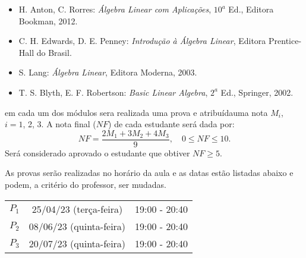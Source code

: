 \documentclass[12pt]{exam}
\begin{document}
\vspace{0.5cm}
\begin{itemize}


    \item H. Anton, C. Rorres: {\it {\'A}lgebra Linear com Aplicações}, $10^a$ Ed., Editora Bookman, 2012.

    \item C. H. Edwards, D. E. Penney: {\it Introdução à Álgebra Linear}, Editora Prentice-Hall do Brasil.

    \item S. Lang: {\it Álgebra Linear}, Editora Moderna, 2003.

    \item T. S. Blyth, E. F. Robertson: {\it Basic Linear Algebra}, $2^a$ Ed., Springer, 2002.
\end{itemize}

 em cada um dos módulos sera realizada uma prova e  atribuídauma nota $M_i$, $i=1$, 2, 3. A nota final ($NF$) de cada estudante ser\'a dada por:
\[
    NF = \dfrac{2M_1 + 3M_2 + 4M_3}{9}, \quad 0 \le NF \le 10.
\]
Ser\'a considerado aprovado o estudante que obtiver $NF \ge 5$.

\vspace{0.5cm}

As provas ser\~ao realizadas no hor\'ario da aula e as datas est\~ao listadas abaixo e podem, a crit\'erio do professor, ser mudadas.

\begin{center}
    \begin{tabular}{c|c|c}
        \hline\hline
        \hspace{1cm}{\bf Prova}\hspace{1cm} & \hspace{3cm}{\bf Data}\hspace{3cm} & \hspace{1.7cm}{\bf Hor\'{a}rio}\hspace{1.7cm} \\
        \hline\hline
        $P_1$ & 25/04/23 (terça-feira) \phantom{x} & 19:00 - 20:40 \\
        \hline
        $P_2$ & 08/06/23 (quinta-feira) \phantom{x} & 19:00 - 20:40 \\
        \hline
        $P_3$ & 20/07/23 (quinta-feira) \phantom{x} & 19:00 - 20:40 \\
        \hline\hline
    \end{tabular}
\end{center}
\end{document}
